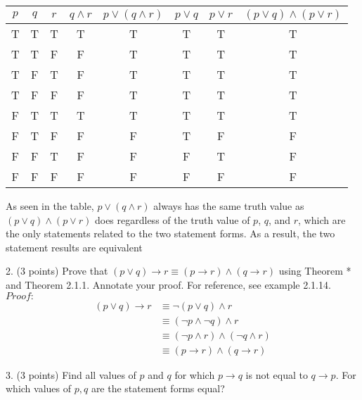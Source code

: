 \documentclass{article}
\begin{document}
\begin{center}
    \begin{tabular}{c|c|c|c|c|c|c|c}
     $p$ & $q$ & $r$ & $q \wedge r$ & $p \vee (q \wedge r) $ & $p \vee q$ & $p \vee r$ & $(p \vee q) \wedge ( p \vee r)$\\
     \hline
     T & T & T & T & T & T & T & T\\
     T & T & F & F & T & T & T & T\\
     T & F & T & F & T & T & T & T\\
     T & F & F & F & T & T & T & T\\
     F & T & T & T & T & T & T & T\\
     F & T & F & F & F & T & F & F\\
     F & F & T & F & F & F & T & F\\
     F & F & F & F & F & F & F & F\\
    \end{tabular}

\end{center}

As seen in the table, $p \vee(q \wedge r)$ always has the same truth value as $(p \vee q) \wedge(p \vee r)$ does regardless of the truth value of $p$, $q$, and $r$, which are the only statements related to the two statement forms. As a result, the two statement results are equivalent





2. (3 points) Prove that $(p \vee q) \rightarrow r \equiv(p \rightarrow r) \wedge(q \rightarrow r)$ using Theorem * and Theorem 2.1.1. Annotate your proof. For reference, see example 2.1.14.\\
$Proof:$
\begin{align}
    (p \vee q) \rightarrow r &\equiv \neg (p \vee q) \wedge r  \tag{by Theorem *} \\
                            &\equiv (\neg p \wedge \neg q) \wedge r \tag{by DeMorgan's Law}\\
                            &\equiv (\neg p \wedge r ) \wedge (\neg q \wedge r) \tag{by Distributive Law}\\
                            &\equiv (p \rightarrow r) \wedge (q \rightarrow r) \tag{by Theorem *} 
\end{align}


3. (3 points) Find all values of $p$ and $q$ for which $p \rightarrow q$ is not equal to $q \rightarrow p$. For which values of $p, q$ are the statement forms equal?
\end{document}
